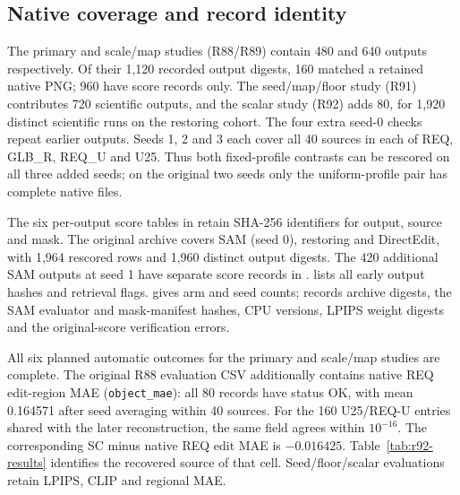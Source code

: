 \documentclass[10pt,doubleanonymous]{ieeeconf}
\begin{document}
\subsection{Native coverage and record identity}
The primary and scale/map studies (R88/R89) contain 480 and 640 outputs respectively. Of their 1,120 recorded output digests, 160 matched a retained native PNG; 960 have score records only. The seed/map/floor study (R91) contributes 720 scientific outputs, and the scalar study (R92) adds 80, for 1,920 distinct scientific runs on the restoring cohort. The four extra seed-0 checks repeat earlier outputs. Seeds 1, 2 and 3 each cover all 40 sources in each of REQ, GLB\_R, REQ\_U and U25. Thus both fixed-profile contrasts can be rescored on all three added seeds; on the original two seeds only the uniform-profile pair has complete native files.

The six per-output score tables in  retain SHA-256 identifiers for output, source and mask. The original archive covers SAM (seed 0), restoring and DirectEdit, with 1,964 rescored rows and 1,960 distinct output digests. The 420 additional SAM outputs at seed 1 have separate score records in .  lists all early output hashes and retrieval flags.  gives arm and seed counts;  records archive digests, the SAM evaluator and mask-manifest hashes, CPU versions, LPIPS weight digests and the original-score verification errors.

All six planned automatic outcomes for the primary and scale/map studies are complete. The original R88 evaluation CSV additionally contains native REQ edit-region MAE (\texttt{object\_mae}): all 80 records have status OK, with mean 0.164571 after seed averaging within 40 sources. For the 160 U25/REQ-U entries shared with the later reconstruction, the same field agrees within $10^{-16}$. The corresponding SC minus native REQ edit MAE is $-0.016425$. Table~\ref{tab:r92-results} identifies the recovered source of that cell. Seed/floor/scalar evaluations retain LPIPS, CLIP and regional MAE.
\end{document}
